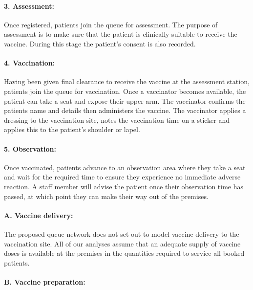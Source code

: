 \documentclass{article}
\begin{document}
\hypertarget{assessment}{%
\paragraph{3. Assessment:}\label{assessment}}

Once registered, patients join the queue for assessment. The purpose of
assessment is to make sure that the patient is clinically suitable to
receive the vaccine. During this stage the patient's consent is also
recorded.

\hypertarget{vaccination}{%
\paragraph{4. Vaccination:}\label{vaccination}}

Having been given final clearance to receive the vaccine at the
assessment station, patients join the queue for vaccination. Once a
vaccinator becomes available, the patient can take a seat and expose
their upper arm. The vaccinator confirms the patients name and details
then administers the vaccine. The vaccinator applies a dressing to the
vaccination site, notes the vaccination time on a sticker and applies
this to the patient's shoulder or lapel.

\hypertarget{observation}{%
\paragraph{5. Observation:}\label{observation}}

Once vaccinated, patients advance to an observation area where they take
a seat and wait for the required time to ensure they experience no
immediate adverse reaction. A staff member will advise the patient once
their observation time has passed, at which point they can make their
way out of the premises.

\hypertarget{a.-vaccine-delivery}{%
\paragraph{A. Vaccine delivery:}\label{a.-vaccine-delivery}}

The proposed queue network does not set out to model vaccine delivery to
the vaccination site. All of our analyses assume that an adequate supply
of vaccine doses is available at the premises in the quantities required
to service all booked patients.

\hypertarget{b.-vaccine-preparation}{%
\paragraph{B. Vaccine preparation:}\label{b.-vaccine-preparation}}
\end{document}
